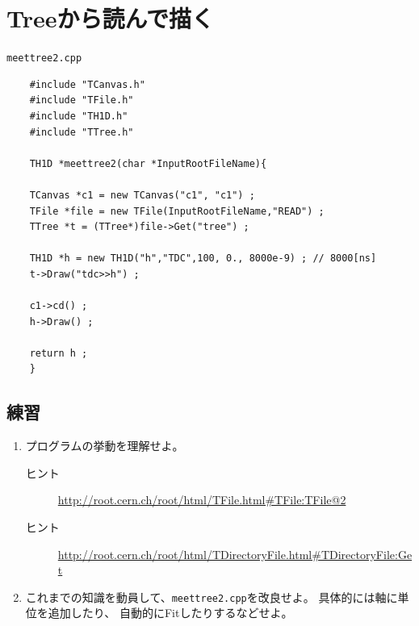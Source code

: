 \documentclass{jarticle}
\begin{document}
 \section{Treeから読んで描く}

 \begin{itembox}{\texttt{meettree2.cpp}}
\begin{verbatim}
	#include "TCanvas.h"
	#include "TFile.h"
	#include "TH1D.h"
	#include "TTree.h"

	TH1D *meettree2(char *InputRootFileName){

	TCanvas *c1 = new TCanvas("c1", "c1") ;
	TFile *file = new TFile(InputRootFileName,"READ") ;
	TTree *t = (TTree*)file->Get("tree") ;

	TH1D *h = new TH1D("h","TDC",100, 0., 8000e-9) ; // 8000[ns]
	t->Draw("tdc>>h") ;

	c1->cd() ;
	h->Draw() ;

	return h ;
	}
\end{verbatim}
 \end{itembox}


  \subsection{練習}
  \begin{enumerate}
   \item プログラムの挙動を理解せよ。
	 \begin{description}
	  \item[ヒント] \url{http://root.cern.ch/root/html/TFile.html#TFile:TFile@2}
	  \item[ヒント] \url{http://root.cern.ch/root/html/TDirectoryFile.html#TDirectoryFile:Get}
	 \end{description}
   \item これまでの知識を動員して、\verb|meettree2.cpp|を改良せよ。
	 具体的には軸に単位を追加したり、
	 自動的にFitしたりするなどせよ。
  \end{enumerate}
\end{document}

